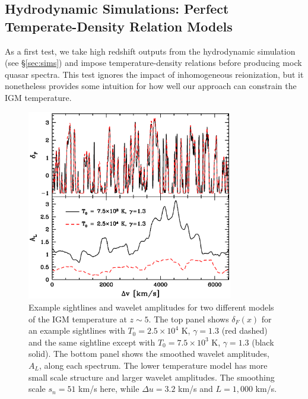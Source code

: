 \subsection{Hydrodynamic Simulations: Perfect Temperate-Density Relation Models}

As a first test, we take high redshift outputs from the hydrodynamic simulation (see \S \ref{sec:sims}) and impose temperature-density relations
before producing mock quasar spectra. This test ignores the impact of inhomogeneous reionization, but it nonetheless provides
some intuition for how well our approach can constrain the IGM temperature.

\begin{figure}
\bc
\includegraphics[width=9cm]{f10.eps}
\caption{Example sightlines and wavelet amplitudes for two different models of the IGM temperature at $z \sim 5$.
The top panel shows $\delta_F(x)$ for an example sightlines with $T_0 = 2.5 \times 10^4$ K, $\gamma=1.3$ (red dashed) and the same sightline except with $T_0 = 7.5 \times
10^3$ K, $\gamma=1.3$ (black solid). The bottom panel shows the smoothed wavelet amplitudes, $A_L$, along each spectrum.
The lower temperature model has more small scale structure and larger wavelet amplitudes. The smoothing scale $s_n=51$ km/s here, while
$\Delta u = 3.2$ km/s and $L=1,000$ km/s.}
\label{fig:examp_sightlines}
\ec
\end{figure}

